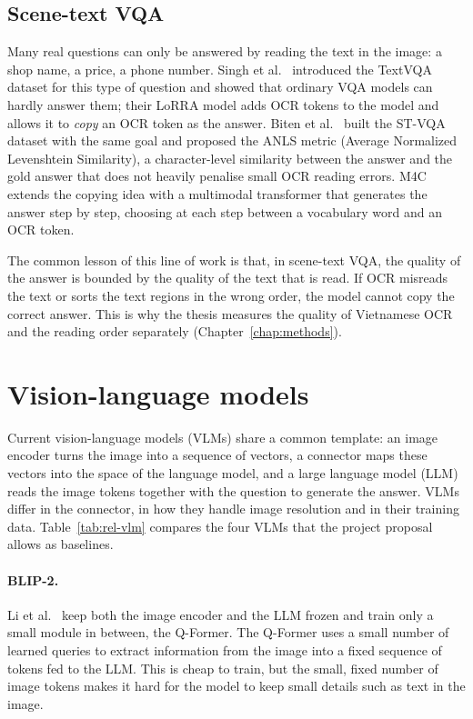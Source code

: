 \subsection{Scene-text VQA}

Many real questions can only be answered by reading the text in the image: a shop
name, a price, a phone number. Singh et al.~\cite{singh2019textvqa} introduced the
TextVQA dataset for this type of question and showed that ordinary VQA models can
hardly answer them; their LoRRA model adds OCR tokens to the model and allows it to
\emph{copy} an OCR token as the answer. Biten et al.~\cite{biten2019stvqa} built the
ST-VQA dataset with the same goal and proposed the ANLS metric (Average Normalized
Levenshtein Similarity), a character-level similarity between the answer and the gold
answer that does not heavily penalise small OCR reading errors. M4C~\cite{hu2020m4c}
extends the copying idea with a multimodal transformer that generates the answer step
by step, choosing at each step between a vocabulary word and an OCR token.

The common lesson of this line of work is that, in scene-text VQA, the quality of the
answer is bounded by the quality of the text that is read. If OCR misreads the text or
sorts the text regions in the wrong order, the model cannot copy the correct answer.
This is why the thesis measures the quality of Vietnamese OCR and the reading order
separately (Chapter~\ref{chap:methods}).

\section{Vision-language models}
\label{sec:rel-vlm}

Current vision-language models (VLMs) share a common template: an image encoder turns
the image into a sequence of vectors, a connector maps these vectors into the space of
the language model, and a large language model (LLM) reads the image tokens together
with the question to generate the answer. VLMs differ in the connector, in how they
handle image resolution and in their training data. Table~\ref{tab:rel-vlm} compares
the four VLMs that the project proposal allows as baselines.

\paragraph{BLIP-2.} Li et al.~\cite{li2023blip2} keep both the image encoder and the
LLM frozen and train only a small module in between, the Q-Former. The Q-Former uses a
small number of learned queries to extract information from the image into a fixed
sequence of tokens fed to the LLM. This is cheap to train, but the small, fixed number
of image tokens makes it hard for the model to keep small details such as text in the
image.

